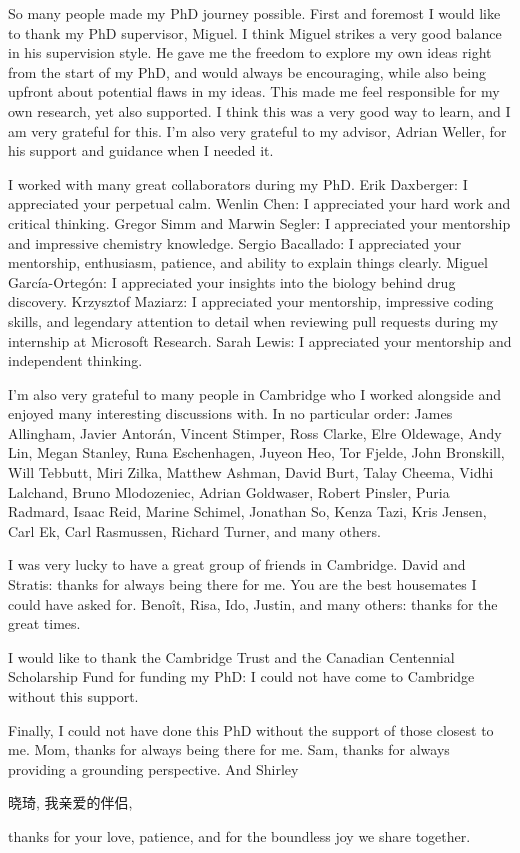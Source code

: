 
\begin{acknowledgements}      

So many people made my PhD journey possible.
First and foremost I would like to thank my PhD supervisor, Miguel.
I think Miguel strikes a very good balance in his supervision style.
He gave me the freedom to explore my own ideas right from the start of my PhD,
and would always be encouraging, while also being upfront about potential flaws in my ideas.
This made me feel responsible for my own research, yet also supported.
I think this was a very good way to learn, and I am very grateful for this.
I'm also very grateful to my advisor, Adrian Weller, for his support and guidance
when I needed it.

I worked with many great collaborators during my PhD.
Erik Daxberger: I appreciated your perpetual calm.
Wenlin Chen: I appreciated your hard work and critical thinking.
Gregor Simm and Marwin Segler: I appreciated your mentorship and impressive chemistry knowledge.
Sergio Bacallado: I appreciated your mentorship, enthusiasm, patience, and ability to explain things clearly.
Miguel Garc{\'i}a-Orteg{\'o}n: I appreciated your insights into the biology behind drug discovery.
Krzysztof Maziarz: I appreciated your mentorship, impressive coding skills,
and legendary attention to detail when reviewing pull requests during my internship at Microsoft Research.
Sarah Lewis: I appreciated your mentorship and independent thinking.

I'm also very grateful to many people in Cambridge who I worked alongside
and enjoyed many interesting discussions with.
In no particular order:
James Allingham,
Javier {Antor\'an},
Vincent Stimper, Ross Clarke, Elre Oldewage,
Andy Lin, Megan Stanley, Runa Eschenhagen, Juyeon Heo, Tor Fjelde,
John Bronskill, Will Tebbutt, Miri Zilka, Matthew Ashman, David Burt,
Talay Cheema,
Vidhi Lalchand,
Bruno Mlodozeniec,
Adrian Goldwaser,
Robert Pinsler, Puria Radmard, Isaac Reid,
Marine Schimel, Jonathan So, Kenza Tazi, Kris Jensen,
Carl Ek, Carl Rasmussen, Richard Turner, and many others.

I was very lucky to have a great group of friends in Cambridge.
David and Stratis: thanks for always being there for me.
You are the best housemates I could have asked for.
Beno\^it, Risa, Ido, Justin, and many others: thanks for the great times.

I would like to thank the Cambridge Trust and the Canadian Centennial Scholarship Fund for funding my PhD:
I could not have come to Cambridge without this support.

Finally, I could not have done this PhD without the support of those closest to me.
Mom, thanks for always being there for me.
Sam, thanks for always providing a grounding perspective.
And Shirley%
\begin{CJK*}{UTF8}{gbsn}
晓琦, 我亲爱的伴侣,
\end{CJK*}
thanks for your love, patience,
and for the boundless joy we share together.

\end{acknowledgements}
